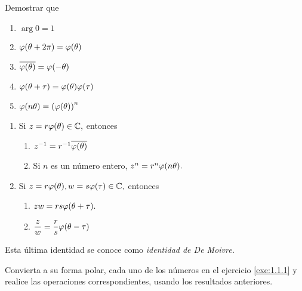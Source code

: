 \begin{problema}
	Demostrar que
	\begin{enumerate}
		\item $\arg{0}=1$
		\item $\varphi(\theta+2\pi)=\varphi(\theta)$
		\item $\overline{\varphi(\theta)}=\varphi(-\theta)$
		\item $\varphi(\theta+\tau)=\varphi(\theta)\varphi(\tau)$
		\item $\varphi(n\theta)=\left( \varphi(\theta) \right)^{n}$
	\end{enumerate}
	
\end{problema}

\begin{problema}
	\begin{enumerate}
		\item Si $z=r\varphi(\theta) \in \mathbb{C},$ entonces
		\begin{enumerate}
			\item   $
			z^{-1}=r^{-1} \overline{\varphi(\theta)}
			$
			\item Si $n$ es un número entero, $
			z^{n}=r^{n}\varphi(n \theta).
			$
		\end{enumerate}
		
		
		\item Si $z=r\varphi(\theta), w=s\varphi(\tau) \in \mathbb{C},$ entonces
		\begin{enumerate}
			\item   $
			zw=rs\varphi(\theta+\tau).
			$
			\item
			$
			\dfrac{z}{w}=\dfrac{r}{s}\varphi(\theta-\tau)
			$
		\end{enumerate}
		
		
		
		
		
	\end{enumerate}
	
\end{problema}

Esta última identidad se conoce como \emph{identidad de De Moivre.}


\begin{problema}
	Convierta a su forma polar, cada uno de los números en el ejercicio \ref{exe:1.1.1} y realice las operaciones
	correspondientes, usando los resultados anteriores. 
\end{problema}


